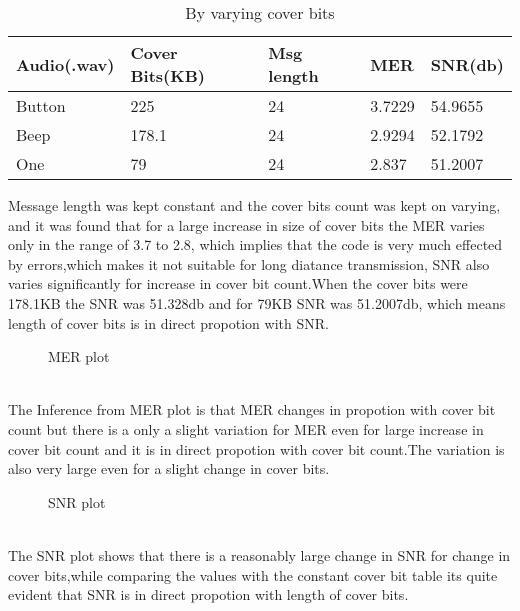 \documentclass[a4paper, 12pt, notitlepage]{report}
\begin{document}
\begin{table}[h]
\begin{tabular}{|l|l|l|l|l|}
\hline
\textbf{ Audio(.wav)}&\textbf{Cover Bits(KB)}&\textbf{Msg length}&\textbf{MER}&\textbf{SNR(db)} \\ \hline
 Button&225  &24  &3.7229  &54.9655  \\ \hline
 Beep&178.1  &24  &2.9294  &52.1792  \\ \hline
 One&79  &24  &2.837  &51.2007  \\ \hline
\end{tabular}
\caption{By varying cover bits}
\end{table}

Message length was kept constant and the cover bits count was kept on varying, and it was found that for a large increase in size of cover bits the MER varies only in the range of 3.7 to 2.8, which implies that the code is very much effected by errors,which makes it not suitable for long diatance transmission, SNR also varies significantly for increase in cover bit count.When the cover bits were 178.1KB the SNR was 51.328db and for 79KB SNR was 51.2007db, which means length of cover bits is in direct propotion with SNR.\\

\newpage
\begin{figure}[h!]
{\par}
\caption{MER plot}
\end{figure}\\

The Inference from MER plot is that MER changes in propotion with cover bit count but there is a only a slight variation for MER even for large increase in cover bit count and it is in direct propotion with cover bit count.The variation is also very large even for a slight change in cover bits.\\ 

\begin{figure}[h!]
{\par}
\caption{SNR plot}
\end{figure}\\

The SNR plot shows that there is a reasonably large change in SNR for change in cover bits,while comparing the values with the constant cover bit table its quite evident that SNR is in direct propotion with length of cover bits.\\ 
\end{document}
